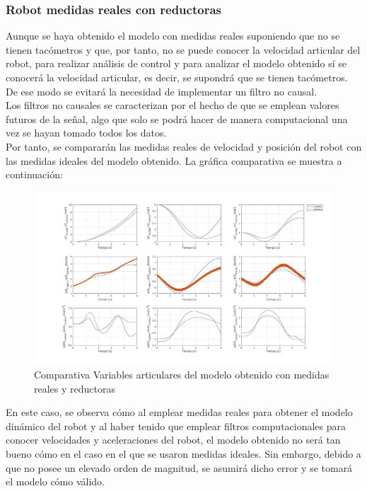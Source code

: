\subsubsection{Robot medidas reales con reductoras}

Aunque se haya obtenido el modelo con medidas reales suponiendo que no se tienen tacómetros y que, por tanto, no se puede conocer la velocidad articular del robot, para realizar análisis de control y para analizar el modelo obtenido sí se conocerá la velocidad articular, es decir, se supondrá que se tienen tacómetros. De ese modo se evitará la necesidad de implementar un filtro no causal. \\

Los filtros no causales se caracterizan por el hecho de que se emplean valores futuros de la señal, algo que solo se podrá hacer de manera computacional una vez se hayan tomado todos los datos.\\



Por tanto, se compararán las medidas reales de velocidad y posición del robot con las medidas ideales del modelo obtenido. La gráfica comparativa se muestra a continuación:



\begin{figure}[h!]

	\centering

	\includegraphics[width=1\textwidth]{EstimacParam_SisMod_In1_RealCR}

	\caption{Comparativa Variables articulares del modelo obtenido con medidas reales y reductoras}

\end{figure}



En este caso, se observa cómo al emplear medidas reales para obtener el modelo dinámico del robot y al haber tenido que emplear filtros computacionales para conocer velocidades y aceleraciones del robot, el modelo obtenido no será tan bueno cómo en el caso en el que se usaron medidas ideales. Sin embargo, debido a que no posee un elevado orden de magnitud, se asumirá dicho error y se tomará el modelo cómo válido.\\

